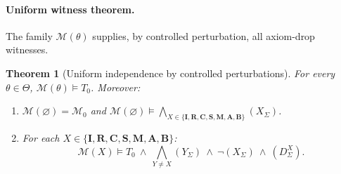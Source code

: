 \documentclass[12pt]{article}
\newtheorem{theorem}{Theorem}
\begin{document}
\paragraph{Uniform witness theorem.}
The family $\mathcal{M}(\theta)$ supplies, by controlled perturbation, all axiom-drop witnesses.

\begin{theorem}[Uniform independence by controlled perturbations]
\label{thm:uniform-indep}
For every $\theta\in\Theta$, $\mathcal{M}(\theta)\models T_0$. Moreover:
\begin{enumerate}[label=(\alph*), leftmargin=2.2em]
\item $\mathcal{M}(\varnothing)=\mathcal{M}_0$ and $\mathcal{M}(\varnothing)\models \bigwedge_{X\in\{\mathbf{I},\mathbf{R},\mathbf{C},\mathbf{S},\mathbf{M},\mathbf{A},\mathbf{B}\}} (X_\Sigma)$.
\item For each $X\in\{\mathbf{I},\mathbf{R},\mathbf{C},\mathbf{S},\mathbf{M},\mathbf{A},\mathbf{B}\}$:
\[
\mathcal{M}(X)\models T_0\ \wedge\ \bigwedge_{Y\neq X}(Y_\Sigma)\ \wedge\ \neg (X_\Sigma)\ \wedge\ (D^X_\Sigma).
\]
\end{enumerate}
\end{theorem}
\end{document}
